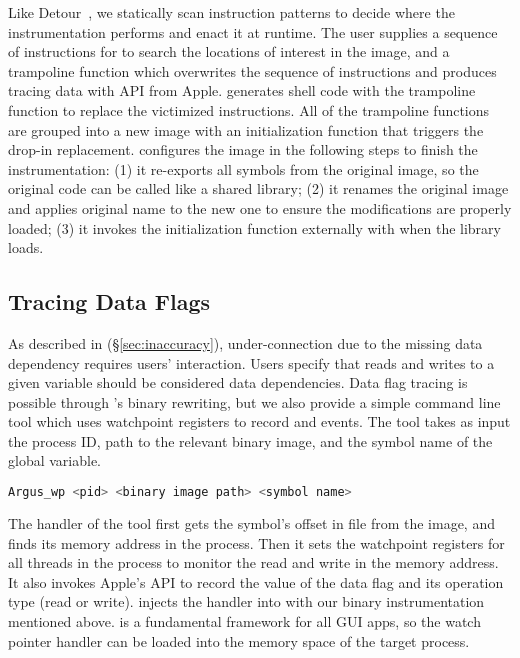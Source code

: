 Like Detour~\cite{hunt1999detours}, we statically scan instruction patterns
to decide where the instrumentation performs and enact it at runtime. The
user supplies a sequence of instructions for \xxx to search the locations of
interest in the image, and a trampoline function which overwrites the sequence
of instructions and produces tracing data with API  from
Apple. \xxx generates shell code with the trampoline function to replace the
victimized instructions. All of the trampoline functions are grouped into a new
image with an initialization function that triggers the drop-in replacement.
\xxx configures the image in the following steps to finish the instrumentation:
(1) it re-exports all symbols from the original image, so the original code can
be called like a shared library; (2) it renames the original image and applies
original name to the new one to ensure the modifications are properly loaded;
(3) it invokes the initialization function externally with 
when the library loads.

\subsection{Tracing Data Flags} \label{subsec:tcp}

As described in (\S\ref{sec:inaccuracy}), under-connection due to the missing
data dependency requires users' interaction. Users specify that reads and writes
to a given variable should be considered data dependencies. Data flag tracing
is possible through \xxx's binary rewriting, but we also provide a simple
command line tool which uses watchpoint registers to record \dataflagwrite and
\dataflagread events. The tool  takes as input the process ID,
path to the relevant binary image, and the symbol name of the global variable.

\begin{lstlisting}[language=c++,numbers=none]
Argus_wp <pid> <binary image path> <symbol name>
\end{lstlisting}

The handler of the tool first gets the symbol's offset in file from the image,
and finds its memory address in the process. Then it sets the watchpoint
registers for all threads in the process to monitor the read and write in the
memory address. It also invokes Apple's API  to record the
value of the data flag and its operation type (read or write). \xxx injects
the handler into  with our binary instrumentation mentioned
above.  is a fundamental framework for all GUI apps, so the
watch pointer handler can be loaded into the memory space of the target process.

